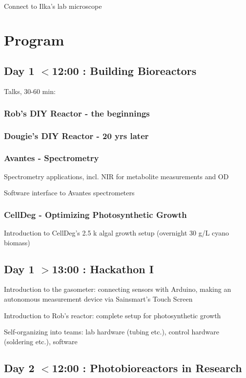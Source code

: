 \documentclass[12pt,a4paper]{article}
\begin{document}
Connect to Ilka's lab microscope


\newpage

\section{Program}

\subsection{Day 1 $<$12:00 : Building Bioreactors}

Talks, 30-60 min:

\subsubsection{Rob's DIY Reactor - the beginnings}
\subsubsection{Dougie's DIY Reactor - 20 yrs later}
\subsubsection{Avantes - Spectrometry}

Spectrometry applications, incl. NIR for metabolite measurements and OD

Software interface to Avantes spectrometers

\subsubsection{CellDeg - Optimizing Photosynthetic Growth}

Introduction to CellDeg's 2.5 k algal growth setup (overnight 30 g/L
cyano biomass)

\subsection{Day 1 $>$13:00 : Hackathon I}

Introduction to the gasometer: connecting sensors with Arduino,
making an autonomous measurement device via Sainsmart's Touch Screen

Introduction to Rob's reactor: complete setup for photosynthetic growth

Self-organizing into teams: lab hardware (tubing etc.), control hardware
(soldering etc.), software

\subsection{Day 2 $<$12:00 : Photobioreactors in Research}
\end{document}
